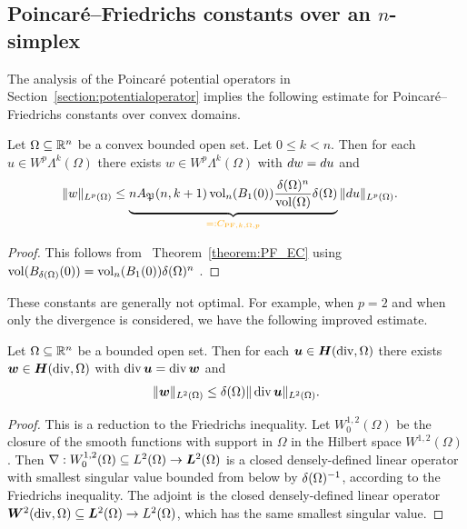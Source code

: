 \documentclass[10pt,letterpaper]{article}
\newcommand\cye[1]{%
  \protect\leavevmode
  \begingroup
    \color{red!35!yellow}%
    #1%
  \endgroup
}
\begin{document}
\subsection{\cye{Poincar\'e--Friedrichs constants over an $n$-simplex}}

The analysis of the Poincar\'e potential operators in Section~\ref{section:potentialoperator}
implies the following estimate for Poincar\'e--Friedrichs constants over convex domains. 


\begin{lemma}\label{lemma:PFexteriorsimplex}
    Let $\Omega \subseteq {\mathbb R}^{n}$ be a convex bounded open set. 
    Let $0 \leq k < n$. 
    Then for each $u \in W^{p}\Lambda^{k}(\Omega)$ 
    there exists $w \in W^{p}\Lambda^{k}(\Omega)$ 
    with $d w = d u$ and 
    \begin{align*}
        \| w \|_{L^{p}(\Omega)}
        &
        \leq 
        \underbrace{
        n A_{\Poinc}(n,k+1) 
        \vol_{n}(B_1(0)) 
        \frac{ \diam(\Omega)^{n} }{ \vol(\Omega) } 
        \diam(\Omega)
        }_{\cye{=:C_{{\rm{PF}},k,\Omega,p}}}
        \| \cartan u \|_{L^{p}(\Omega)}
        .
    \end{align*}
\end{lemma}
\begin{proof}
    This follows from~\cye{Theorem~\ref{theorem:PF_EC} using $\operatorname{vol}(B_{{\delta}(\Omega)}(0)) =         \operatorname{vol}_{n}(B_1(0)) {\delta}(\Omega)^{n}$}.
\end{proof}

These constants are generally not optimal. 
For example, when $p=2$ and \cye{when} only the divergence is considered, 
we have the following improved estimate. 

\begin{lemma}\label{lemma:PFfordivergence}
    Let $\Omega \subseteq {\mathbb R}^{n}$ be a bounded open set. 
    Then for each $\bm{u} \in \bm{H}(\operatorname{div},\Omega)$  there exists $\bm{w} \in \bm{H}(\operatorname{div},\Omega)$ with $\operatorname{div} \bm{u} = \operatorname{div} \bm{w}$ and 
    \begin{align*}
        \| \bm{w} \|_{L^{2}(\Omega)} 
        \leq 
        {\delta}(\Omega) \| \operatorname{div} \bm{u} \|_{L^{2}(\Omega)}
        .
    \end{align*}
\end{lemma}
\begin{proof}
    This is a reduction to \cye{the} Friedrichs inequality. 
    Let $W^{1,2}_{0}(\Omega)$ be the closure of the smooth functions with support in $\Omega$ in the Hilbert space $W^{1,2}(\Omega)$. 
    Then $\nabla : W^{1,2}_{0}(\Omega) \subseteq L^{2}(\Omega) \rightarrow \bm{L}^{2}(\Omega)$ is a closed densely-defined linear operator 
    with smallest singular value bounded from below by ${\delta}(\Omega)^{-1}$, according to \cye{the} Friedrichs inequality. 
    The adjoint is the closed densely-defined linear operator $\bm{W}^{2}(\operatorname{div},\Omega) \subseteq \bm{L}^{2}(\Omega) \rightarrow L^{2}(\Omega)$,
    which has the same smallest singular value. 
\end{proof}
\end{document}
